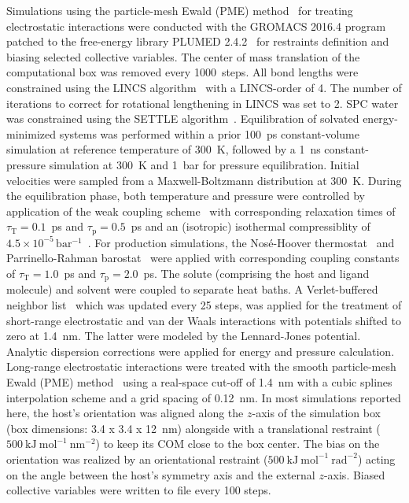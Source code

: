 \documentclass[9pt,lessons,pubversion]{livecoms}
\begin{document}
Simulations using the particle-mesh Ewald (PME) method~\cite{darden1993particle, essmann1995smooth} for treating electrostatic interactions were conducted with the 
GROMACS 2016.4 program~\cite{berendsen1995gromacs, hess2008gromacs, abraham2015gromacs} patched to the free-energy library 
PLUMED 2.4.2~\cite{tribello2014plumed} for restraints definition and biasing selected collective variables.
The center of mass translation of the computational box was removed every 1000~steps. 
All bond lengths were constrained using the LINCS algorithm~\cite{hess1997lincs, hess2008p} with a LINCS-order of 4. 
The number of iterations to correct for rotational lengthening in LINCS was set to 2.
SPC water was constrained using the SETTLE algorithm~\cite{miyamoto1992settle}.
Equilibration of solvated energy-minimized systems was performed within a prior 100~ps constant-volume simulation at reference temperature of 300~K, followed by a 1~ns constant-pressure simulation at 300~K and 1~bar for pressure equilibration.
Initial velocities were sampled from a Maxwell-Boltzmann distribution at 300~K.
During the equilibration phase, both temperature and pressure were controlled by application of the weak coupling scheme~\cite{berendsen1984molecular} with corresponding relaxation times of 
$\tau_\mathrm{T} = 0.1$~ps and $\tau_\mathrm{p} = 0.5$~ps and an (isotropic) isothermal compressiblity of $4.5\times 10^{-5}\,\mathrm{bar^{-1}}$~\cite{kell1967precise}.
For production simulations, the Nos\'{e}-Hoover thermostat~\cite{nose1984molecular, hoover1985canonical, martyna1996explicit} and Parrinello-Rahman barostat~\cite{parrinello1981polymorphic, nose1983constant} were applied with corresponding coupling constants of $\tau_\mathrm{T} = 1.0$~ps and $\tau_\mathrm{p} = 2.0$~ps.
The solute (comprising the host and ligand molecule) and solvent were coupled to separate heat baths.
A Verlet-buffered neighbor list~\cite{pall2013flexible} which was updated every 25 steps, was applied for the treatment of short-range electrostatic and van der Waals interactions with potentials shifted to zero at 1.4~nm. 
The latter were modeled by the Lennard-Jones potential.
Analytic dispersion corrections were applied for energy and pressure calculation.
Long-range electrostatic interactions were treated with the smooth particle-mesh Ewald (PME) method~\cite{darden1993particle, essmann1995smooth} using a real-space cut-off of 1.4~nm with a cubic splines interpolation scheme and a grid spacing of 0.12~nm.
In most simulations reported here, the host's orientation was aligned along the $z$-axis of the simulation box (box dimensions: 3.4 x 3.4 x 12~nm) alongside with a translational 
restraint ($500~\mathrm{kJ~mol}^{-1}~\mathrm{nm}^{-2}$) to keep its COM close to the box center.
The bias on the orientation was realized by an orientational restraint ($500~\mathrm{kJ~mol^{-1}~rad^{-2}}$) acting on the angle between the host's symmetry axis and the external $z$-axis.
Biased collective variables were written to file every 100 steps.
\end{document}

